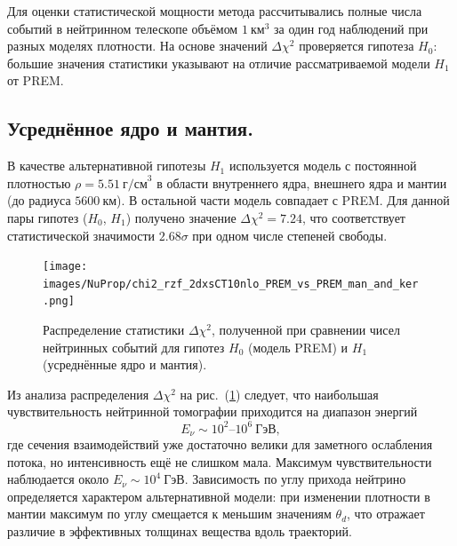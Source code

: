 Для оценки статистической мощности метода рассчитывались полные числа событий в нейтринном телескопе объёмом $1~\text{км}^3$ за один год наблюдений при разных моделях плотности. На основе значений $\Delta\chi^2$ проверяется гипотеза $H_0$: большие значения статистики указывают на отличие рассматриваемой модели $H_1$ от PREM. 

\subsection*{Усреднённое ядро и мантия.}  
В качестве альтернативной гипотезы $H_1$ используется модель с постоянной плотностью $\rho = 5.51~\text{г/см}^3$ в области внутреннего ядра, внешнего ядра и мантии (до радиуса $5600~\text{км}$).  
В остальной части модель совпадает с PREM.  
Для данной пары гипотез ($H_0$, $H_1$) получено значение $\Delta\chi^2 = 7.24$, что соответствует статистической значимости $2.68\sigma$ при одном числе степеней свободы.
  
  \begin{figure}[!h]
    \centering
    \texttt{[image: images/NuProp/chi2\_rzf\_2dxsCT10nlo\_PREM\_vs\_PREM\_man\_and\_ker.png]}
    \caption{Распределение статистики $\Delta\chi^2$, полученной при сравнении чисел нейтринных событий для гипотез $H_0$ (модель PREM) и $H_1$ (усреднённые ядро и мантия).}
    \label{NuTom1}
  \end{figure}

Из анализа распределения $\Delta\chi^2$ на рис.~(\ref{NuTom1}) следует, что наибольшая чувствительность нейтринной томографии приходится на диапазон энергий  
\[
E_\nu \sim 10^2\text{–}10^6~\text{ГэВ},
\]
где сечения взаимодействий уже достаточно велики для заметного ослабления потока, но интенсивность ещё не слишком мала.  
Максимум чувствительности наблюдается около $E_\nu \sim 10^4~\text{ГэВ}$.  
Зависимость по углу прихода нейтрино определяется характером альтернативной модели: при изменении плотности в мантии максимум по углу смещается к меньшим значениям $\theta_d$, что отражает различие в эффективных толщинах вещества вдоль траекторий.
